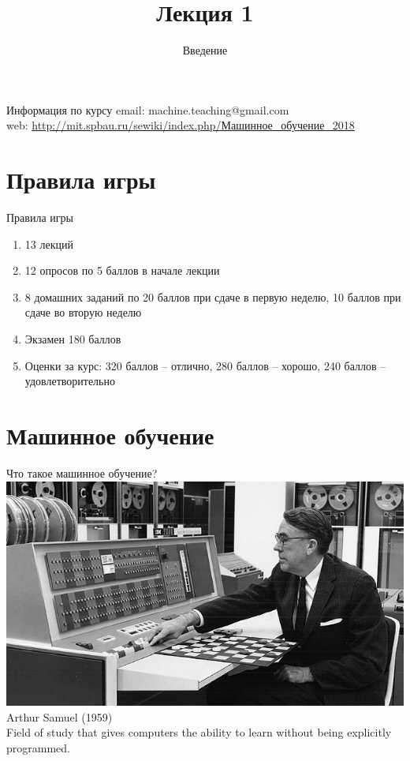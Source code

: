 \documentclass[10pt]{beamer}
\title{Лекция 1}
\subtitle{Введение}
\begin{document}
\maketitle

\begin{frame}{Информация по курсу}
  email: machine.teaching@gmail.com \\
  web: \href{http://mit.spbau.ru/sewiki/index.php/Машинное_обучение_2018}{http://mit.spbau.ru/sewiki/index.php/Машинное\_обучение\_2018}\\
\end{frame}

\section{Правила игры}

\begin{frame}{Правила игры}
  \begin{enumerate} [-]  
    \item 13 лекций
    \item 12 опросов по 5 баллов в начале лекции
    \item 8 домашних заданий по 20 баллов при сдаче в первую неделю, 10 баллов при сдаче во вторую неделю
    \item Экзамен 180 баллов
    \bigbreak
    \item Оценки за курс: \alert{320 баллов} -- отлично, \alert{280 баллов} -- хорошо, \alert{240 баллов} -- удовлетворительно
  \end{enumerate}  
\end{frame}

\section{Машинное обучение}

\begin{frame}{Что такое машинное обучение?}
  \includegraphics[width=0.5 \linewidth, height=0.5 \textheight, keepaspectratio]{images/samuel}\\
	Arthur Samuel (1959) \\
	\bigbreak
	Field of study that gives computers the ability to learn without being explicitly programmed.
\end{frame}
\end{document}
